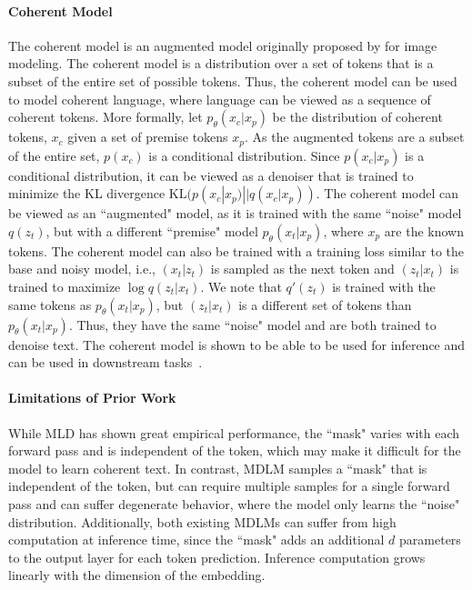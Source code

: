 \documentclass{article} %
\begin{document}
\paragraph{Coherent Model}
The coherent model is an augmented model originally proposed by \citet{austin2023structured} for image modeling. The coherent model is a distribution over a set of tokens that is a subset of the entire set of possible tokens. Thus, the coherent model can be used to model coherent language, where language can be viewed as a sequence of coherent tokens. More formally, let $p_\theta(x_c|x_p)$ be the distribution of coherent tokens, $x_c$ given a set of premise tokens $x_p$. As the augmented tokens are a subset of the entire set, $p(x_c)$ is a conditional distribution. Since $p(x_c|x_p)$ is a conditional distribution, it can be viewed as a denoiser that is trained to minimize the KL divergence $\mathrm{KL}(p(x_c|x_p) || q(x_c|x_p))$. The coherent model can be viewed as an ``augmented" model, as it is trained with the same ``noise" model $q(z_t)$, but with a different ``premise" model $p_\theta(x_t|x_p)$, where $x_p$ are the known tokens. The coherent model can also be trained with a training loss similar to the base and noisy model, i.e., $(x_t|z_t)$ is sampled as the next token and $(z_t|x_t)$ is trained to maximize $\log q(z_t|x_t)$. We note that $q'(z_t)$ is trained with the same tokens as $p_\theta(x_t|x_p)$, but $(z_t|x_t)$ is a different set of tokens than $p_\theta(x_t|x_p)$. Thus, they have the same ``noise" model and are both trained to denoise text. The coherent model is shown to be able to be used for inference and can be used in downstream tasks~\citep{austin2023structured,coja2020replica}.

\paragraph{Limitations of Prior Work}
While MLD has shown great empirical performance, the ``mask" varies with each forward pass and is independent of the token, which may make it difficult for the model to learn coherent text. In contrast, MDLM samples a ``mask" that is independent of the token, but can require multiple samples for a single forward pass and can suffer degenerate behavior, where the model only learns the ``noise" distribution. Additionally, both existing MDLMs can suffer from high computation at inference time, since the ``mask" adds an additional $d$ parameters to the output layer for each token prediction. Inference computation grows linearly with the dimension of the embedding. 
\end{document}
